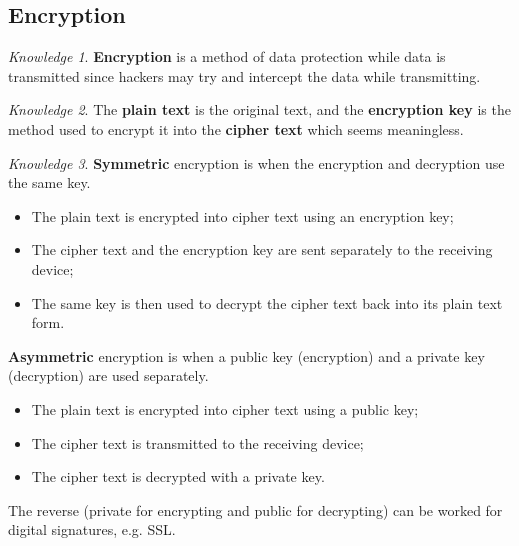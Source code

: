 \documentclass[8pt]{article}
\theoremstyle{remark}
\newtheorem{knowledge}{Knowledge}[subsection]
\begin{document}
        \subsection{Encryption}
            \begin{knowledge}
                \textbf{Encryption} is a method of data protection while data is transmitted since hackers may try and intercept the data while transmitting.
            \end{knowledge}

            \begin{knowledge}
                The \textbf{plain text} is the original text, and the \textbf{encryption key} is the method used to encrypt it into the \textbf{cipher text} which seems meaningless.
            \end{knowledge}

            \begin{knowledge}
                \textbf{Symmetric} encryption is when the encryption and decryption use the same key.
                \begin{itemize}
                    \item The plain text is encrypted into cipher text using an encryption key;
                    \item The cipher text and the encryption key are sent separately to the receiving device;
                    \item The same key is then used to decrypt the cipher text back into its plain text form.
                \end{itemize}

                \textbf{Asymmetric} encryption is when a public key (encryption) and a private key (decryption) are used separately.
                \begin{itemize}
                    \item The plain text is encrypted into cipher text using a public key;
                    \item The cipher text is transmitted to the receiving device;
                    \item The cipher text is decrypted with a private key.
                \end{itemize}

                The reverse (private for encrypting and public for decrypting) can be worked for digital signatures, e.g. SSL.
            \end{knowledge}
\end{document}
